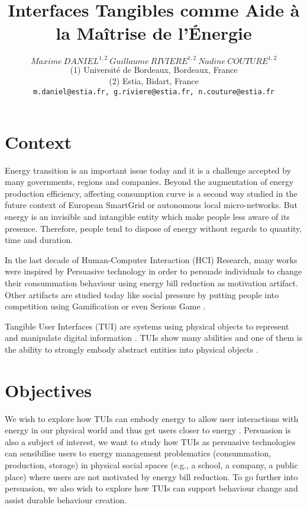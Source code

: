 \documentclass[10pt,a5paper,twoside]{article}
\title{Interfaces Tangibles comme Aide à la Maîtrise de l'Énergie}
\author{$Maxime~DANIEL^{1, 2}~Guillaume~RIVIERE^{1, 2}~Nadine~COUTURE^{1, 2}$\\
{\small  	(1) Université de Bordeaux, Bordeaux, France\\ 
 		(2) Estia, Bidart, France\\
  \texttt{m.daniel@estia.fr, g.riviere@estia.fr, n.couture@estia.fr} \\ 
}}
\begin{document}
\maketitle
\section{Context}
Energy transition is an important issue today and it is a challenge accepted by many governments, regions and companies. Beyond the augmentation of energy production efficiency, affecting consumption curve is a second way studied in the future context of European SmartGrid or autonomous local micro-networks. 
But energy is an invisible and intangible entity which make people less aware of its presence. Therefore, people tend to dispose of energy without regards to quantity, time and duration.\par
In the last decade of Human-Computer Interaction (HCI) Research, many works were inspired by Persuasive technology \cite{fogg2002persuasive} in order to persuade individuals to change their consummation behaviour using energy bill reduction as motivation artifact. Other artifacts are studied today like social pressure by putting people into competition using Gamification \cite{deterding2011game} or even Serious Game \cite{abt1987serious}. \par
Tangible User Interfaces (TUI) are systems using physical objects to represent and manipulate digital information \cite{ishii1997tangible}. TUIs show many abilities and one of them is the ability to strongly embody abstract entities into physical objects \cite{shaer2010tangible}.
\section{Objectives}
We wish to explore how TUIs can embody energy to allow user interactions with energy in our physical world and thus get users closer to energy \cite{pierce2010materializing}\cite{gustafsson2005power}. Persuasion is also a subject of interest, we want to study how TUIs as persuasive technologies can sensibilise users to energy management problematics (consummation, production, storage) in physical social spaces (e.g., a school, a company, a public place) where users are not motivated by energy bill reduction. To go further into persuasion, we also wish to explore how TUIs can support behaviour change and assist durable behaviour creation.
\end{document}
